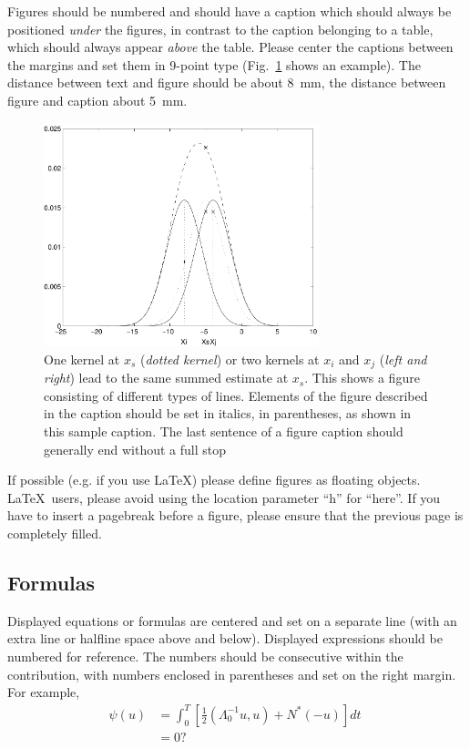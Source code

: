 \documentclass[runningheads]{llncs}
\begin{document}
Figures should be numbered and should have a caption which should
always be positioned {\it under} the figures, in contrast to the caption
belonging to a table, which should always appear {\it above} the table.
Please center the captions between the margins and set them in
9-point type
(Fig.~\ref{fig:example} shows an example).
The distance between text and figure should be about 8~mm, the
distance between figure and caption about 5~mm.
\begin{figure}
\centering
\includegraphics[height=6.5cm]{eijkel2}
\caption{One kernel at $x_s$ ({\it dotted kernel}) or two kernels at
$x_i$ and $x_j$ ({\it left and right}) lead to the same summed estimate
at $x_s$. This shows a figure consisting of different types of
lines. Elements of the figure described in the caption should be set in
italics,
in parentheses, as shown in this sample caption. The last
sentence of a figure caption should generally end without a full stop}
\label{fig:example}
\end{figure}

If possible (e.g. if you use \LaTeX) please define figures as floating
objects. \LaTeX\ users, please avoid using the location
parameter ``h'' for ``here''. If you have to insert a pagebreak before a
figure, please ensure that the previous page is completely filled.


\subsection{Formulas}

Displayed equations or formulas are centered and set on a separate
line (with an extra line or halfline space above and below). Displayed
expressions should be numbered for reference. The numbers should be
consecutive within the contribution,
with numbers enclosed in parentheses and set on the right margin.
For example,
\begin{align}
  \psi (u) & = \int_{0}^{T} \left[\frac{1}{2}
  \left(\Lambda_{0}^{-1} u,u\right) + N^{\ast} (-u)\right] dt \; \\
& = 0 ?
\end{align}
\end{document}
